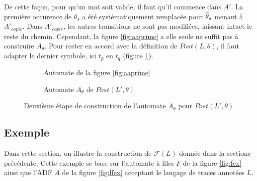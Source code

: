 De cette façon, pour qu'un mot soit valide, il faut qu'il commence dans $A'$. La première occurence de $\theta_s$ a été systématiquement remplacée pour $\bar{\theta}_s$ menant à $A'_{copie}$. Dans $A'_{copie}$, les autres transitions ne sont pas modifiées, laissant intact le reste du chemin. Cependant, la figure \ref{fig:aaprime} a elle seule ne suffit pas à construire $A_\theta$. Pour rester en accord avec la définition de $Post(L,\theta)$, il faut adapter le dernier symbole, ici $t_p$ en $t_q$ (figure \ref{fig:pq}).


\begin{figure}[H]
    \centering
    \begin{subfigure}{0.5\linewidth}
        \centering
        \caption{Automate de la figure \ref{fig:aaprime}}
    \end{subfigure}\hfill
    \begin{subfigure}{0.5\linewidth}
        \centering
        \caption{Automate $A_\theta$ de $Post(L',\theta)$}
    \end{subfigure}
    \caption{Deuxième étape de construction de l'automate $A_\theta$ pour $Post(L',\theta)$}\label{fig:pq}
\end{figure}



\subsection{Exemple}

Dans cette section, on illustre la construction de $\mathcal{F}(L)$ donnée dans la sectione précédente. Cette exemple se base sur l'automate à files $F$ de la figure \ref{fig:fex} ainsi que l'ADF $A$ de la figure \ref{fig:lfex} acceptant le langage de traces annotées $L$.

